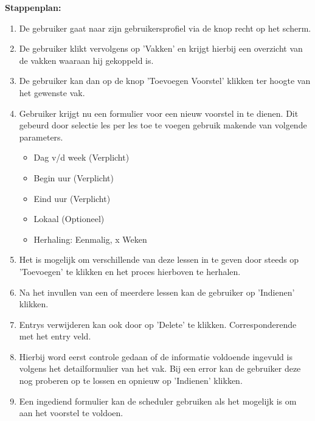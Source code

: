 \textbf{Stappenplan:}
	\begin{enumerate}
	\item De gebruiker gaat naar zijn gebruikersprofiel via de knop recht op het scherm.
	\item De gebruiker klikt vervolgens op 'Vakken' en krijgt hierbij een overzicht van de vakken waaraan hij gekoppeld is.
	\item De gebruiker kan dan op de knop 'Toevoegen Voorstel' klikken ter hoogte van het gewenste vak.
	\item Gebruiker krijgt nu een formulier voor een nieuw voorstel in te dienen. Dit gebeurd door selectie les per les toe te voegen gebruik makende van volgende parameters.
		\begin{itemize}
		\item Dag v/d week (Verplicht)
		\item Begin uur (Verplicht)
		\item Eind uur (Verplicht)
		\item Lokaal (Optioneel)
		\item Herhaling: Eenmalig, x Weken
		\end{itemize}
	\item Het is mogelijk om verschillende van deze lessen in te geven door steeds op 'Toevoegen' te klikken en het proces hierboven te herhalen.
	\item Na het invullen van een of meerdere lessen kan de gebruiker op 'Indienen' klikken.
	\item Entrys verwijderen kan ook door op 'Delete' te klikken. Corresponderende met het entry veld.
	\item Hierbij word eerst controle gedaan of de informatie voldoende ingevuld is volgens het detailformulier van het vak. Bij een error kan de gebruiker deze nog proberen op te lossen en opnieuw op 'Indienen' klikken.
	\item Een ingediend formulier kan de scheduler gebruiken als het mogelijk is om aan het voorstel te voldoen.
	\end{enumerate}	        

